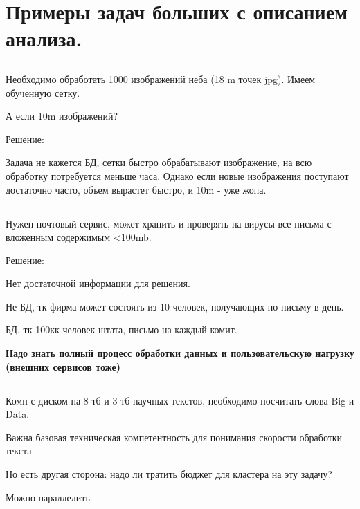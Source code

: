 \section{Примеры задач больших с описанием анализа.}

\subsection*{}

Необходимо обработать 1000 изображений неба (18 m точек jpg). Имеем
обученную сетку.

А если 10m изображений?

Решение:

Задача не кажется БД, сетки быстро обрабатывают изображение, на всю обработку
потребуется меньше часа. Однако если новые изображения поступают достаточно часто,
объем вырастет быстро, и 10m - уже жопа.


\subsection*{}

Нужен почтовый сервис, может хранить и проверять на вирусы все письма с вложенным
содержимым <100mb.

Решение:

Нет достаточной информации для решения.

Не БД, тк фирма может состоять из 10 человек, получающих по письму в день.

БД, тк 100кк человек штата, письмо на каждый комит.

\textbf{Надо знать полный процесс обработки данных и пользовательскую нагрузку
(внешних сервисов тоже)}

\subsection*{}

Комп с диском на 8 тб и 3 тб научных текстов, необходимо посчитать слова
Big и Data.

Важна базовая техническая компетентность для понимания скорости обработки
текста.

Но есть другая сторона: надо ли тратить бюджет для кластера на эту задачу?

Можно параллелить.
